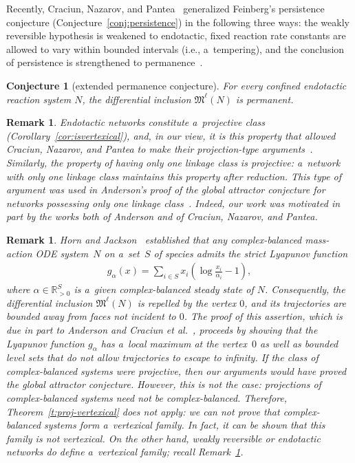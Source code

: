 \documentclass[pdftex]{sigma}
\newtheorem{Conjecture}[Theorem]{Conjecture}
\newtheorem{Remark}[Theorem]{Remark}
\begin{document}
Recently, Craciun, Nazarov, and Pantea~\cite{CNP} generalized Feinberg's persistence conjecture
(Conjecture~\ref{conj:persistence}) in the following three ways: the weakly reversible hypothesis is weakened to
endotactic, f\/ixed reaction rate constants are allowed to vary within bounded intervals (i.e., a~tempering), and the
conclusion of persistence is strengthened to permanence~\cite[\S~4]{CNP}.
\begin{Conjecture}[extended permanence conjecture]
\label{conj:perm}
For every confined endotactic reaction system $N$, the differential inclusion $\mathfrak M^\ell(N)$ is permanent.
\end{Conjecture}
\begin{Remark}
\label{r:projective_class}
Endotactic networks constitute a~projective class (Corollary~\ref{cor:isvertexical}), and, in our view, it is this
property that allowed Craciun, Nazarov, and Pantea to make their projection-type arguments~\cite{CNP, Pantea}.
Similarly, the property of having only one linkage class is projective: a~network with only one linkage class maintains
this property after reduction.
This type of argument was used in Anderson's proof of the global attractor conjecture for networks possessing only one
linkage class~\cite{Anderson11}.
Indeed, our work was motivated in part by the works both of Anderson and of Craciun, Nazarov, and Pantea.
\end{Remark}
\begin{Remark}
\label{r:lyapunov}
Horn and Jackson~\cite{HornJackson} established that any complex-balanced mass-action ODE system~$N$ on a~set~$S$ of
species admits the strict Lyapunov function
\begin{gather*}
g_\alpha(x)=\sum_{i\in S}x_i\left(\log\frac{x_i}{\alpha_i}-1\right),
\end{gather*}
where $\alpha\in\mathbb{R}_{>0}^S$ is a~given complex-balanced steady state of $N$.
Consequently, the dif\/ferential inclusion $\mathfrak M^\ell(N)$ is repelled by the vertex $0$, and its trajectories
are bounded away from faces not incident to $0$.
The proof of this assertion, which is due in part to Anderson and Craciun et al.~\cite{Anderson08,TDS}, proceeds by
showing that the Lyapunov function $g_\alpha$ has a~local maximum at the vertex~$0$ as well as bounded level sets that
do not allow trajectories to escape to inf\/inity.
If the class of complex-balanced systems were projective, then our arguments would have proved the global attractor
conjecture.
However, this is not the case: projections of complex-balanced systems need not be complex-balanced.
Therefore, Theorem~\ref{t:proj-vertexical} does not apply: we can not prove that complex-balanced systems form
a~vertexical family.
In fact, it can be shown that this family is not vertexical.
On the other hand, weakly reversible or endotactic networks do def\/ine a~vertexical family; recall
Remark~\ref{r:projective_class}.
\end{Remark}
\end{document}
